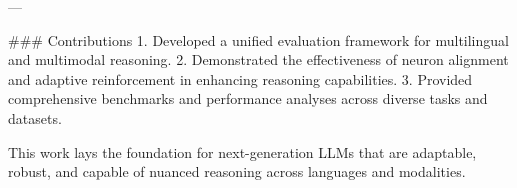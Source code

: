 ---

### Contributions
1. Developed a unified evaluation framework for multilingual and multimodal reasoning.
2. Demonstrated the effectiveness of neuron alignment and adaptive reinforcement in enhancing reasoning capabilities.
3. Provided comprehensive benchmarks and performance analyses across diverse tasks and datasets.

This work lays the foundation for next-generation LLMs that are adaptable, robust, and capable of nuanced reasoning across languages and modalities.